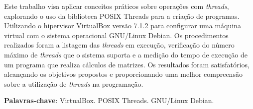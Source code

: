 \documentclass[
	12pt,				%
	oneside,   	        %
	a4paper,			%
	english,			%
	french,				%
	spanish,			%
	brazil,				%
	]{pacotes/abntex2}
\begin{document}
\frenchspacing 



\imprimirfolhaderosto



\begin{resumo}
Este trabalho visa aplicar conceitos práticos sobre operações com \textit{threads}, explorando o uso da biblioteca POSIX Threads para a criação de programas. Utilizando o hipervisor VirtualBox versão 7.1.2 para configurar uma máquina virtual com o sistema operacional GNU/Linux Debian. Os procedimentos realizados foram a listagem das \textit{threads} em execução, verificação do número máximo de \textit{threads} que o sistema suporta e a medição do tempo de execução de um programa que realiza cálculos de matrizes. Os resultados foram satisfatórios, alcançando os objetivos propostos e proporcionando uma melhor compreensão sobre a utilização de \textit{threads} na programação.

 \vspace{\onelineskip}
    
 \noindent
 \textbf{Palavras-chave}: VirtualBox. POSIX Threads. GNU/Linux Debian.
\end{resumo}




\tableofcontents*
\cleardoublepage
\end{document}
